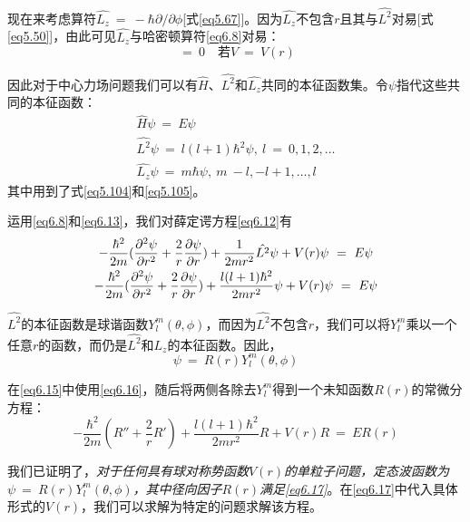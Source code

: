 \documentclass[12pt,a4paper,openany]{ctexbook}
\newcommand{\Ham}{\hat{H}}
\begin{document}
\begin{flushleft}
现在来考虑算符$\hat{L_z}\ =\ -\hbar\partial/\partial\phi$[式\eqref{eq5.67}]。因为$\hat{L_z}$不包含$r$且其与$\hat{L^2}$对易[式\eqref{eq5.50}]，由此可见$\hat{L_z}$与哈密顿算符\eqref{eq6.8}对易：
\begin{equation}
    [\hat{H},\hat{L_z}]\ =\ 0\quad\text{若}V\ =\ V(r) \label{eq6.11}
\end{equation}

因此对于中心力场问题我们可以有$\Ham$、$\hat{L^2}$和$\hat{L_z}$共同的本征函数集。令$\psi$指代这些共同的本征函数：
\begin{gather}
    \boxed{\hat{H}\psi\ =\ E\psi}\ \label{eq6.12} \\
    \boxed{\hat{L^2}\psi\ =\ l(l+1)\hbar^2\psi,\ l\ =\ 0,1,2,\dots} \label{eq6.13} \\
    \boxed{\hat{L_z}\psi\ =\ m\hbar\psi,\ m\ -l,-l+1,\dots,l} \label{eq6.14}
\end{gather}
其中用到了式\eqref{eq5.104}和\eqref{eq5.105}。

运用\eqref{eq6.8}和\eqref{eq6.13}，我们对薛定谔方程\eqref{eq6.12}有
\begin{gather}
    -\frac{\hbar^2}{2m}(\frac{\partial^2\psi}{\partial r^2}+\frac{2}{r}\frac{\partial\psi}{\partial r})+\frac{1}{2mr^2}\hat{L^2}\psi+V(r)\psi\ =\ E\psi \notag \\
    -\frac{\hbar^2}{2m}(\frac{\partial^2\psi}{\partial r^2}+\frac{2}{r}\frac{\partial\psi}{\partial r})+\frac{l(l+1)\hbar^2}{2mr^2}\psi+V(r)\psi\ =\ E\psi \label{eq6.15}
\end{gather}

$\hat{L^2}$的本征函数是球谐函数$Y_l^m(\theta,\phi)$，而因为$\hat{L^2}$不包含$r$，我们可以将$Y_l^m$乘以一个任意$r$的函数，而仍是$\hat{L^2}$和$\hat{L_z}$的本征函数。因此，
\begin{equation}
    \boxed{\psi\ =\ R(r)Y_l^m(\theta,\phi)} \label{eq6.16}
\end{equation}

在\eqref{eq6.15}中使用\eqref{eq6.16}，随后将两侧各除去$Y_l^m$得到一个未知函数$R(r)$的常微分方程：
\begin{equation}
    -\frac{\hbar^2}{2m}(R''+\frac{2}{r}R')+\frac{l(l+1)\hbar^2}{2mr^2}R+V(r)R\ =\ ER(r) \label{eq6.17}
\end{equation}

我们已证明了，\textit{对于任何具有球对称势函数$V(r)$的单粒子问题，定态波函数为$\psi\ =\ R(r)Y_l^m(\theta,\phi)$，其中径向因子$R(r)$满足\eqref{eq6.17}}。在\eqref{eq6.17}中代入具体形式的$V(r)$，我们可以求解为特定的问题求解该方程。
\end{flushleft}
\end{document}
